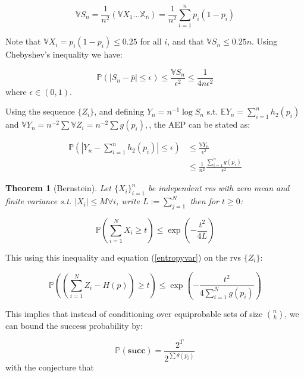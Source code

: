 \documentclass[11pt]{article}
\newtheorem{thm}{Theorem}[section]
\begin{document}
\begin{equation}
\mathbb{V}S_n = \frac{1}{n^2} \left(\mathbb{V}X_1 \ldots	\mathbb{X_n} \right) = \frac{1}{n^2} \sum_{i=1}^{n} p_i\left(1-p_i\right)
\end{equation}

Note that \(\mathbb{V}X_i = p_i\left(1-p_i\right) \leq 0.25\) for all \(i\), and that \(\mathbb{V}S_n \leq 0.25n\). 
Using Chebyshev's inequality we have:

\begin{equation}
\mathbb{P}\left(|S_n - \bar{p}| \leq \epsilon \right) \leq \frac{\mathbb{V}S_n}{\epsilon^2} \leq \frac{1}{4n\epsilon^2}
\end{equation}
where \(\epsilon \in \left(0,1\right)\).

Using the sequence \(\{Z_i\}\), and defining \(Y_n = n^{-1}\log{S_n}\) s.t. \(\mathbb{E}Y_n = \sum_{i=1}^n h_2\left(p_i\right)\) and \(\mathbb{V}Y_n = n^{-2}\sum\mathbb{V}Z_i = n^{-2}\sum g\left(p_i\right),\), the AEP can be stated as:

\begin{align}
\mathbb{P}\left(|Y_n - \sum_{i=1}^n h_2\left(p_i\right)| \leq \epsilon \right) &\leq \frac{\mathbb{V}Y_n}{\epsilon^2} \\ 
&\leq \frac{1}{n^2}\frac{\sum_{i=1}^n g\left(p_i\right)}{\epsilon^2}
\end{align}

\begin{thm}[Bernstein]
Let \(\{X_i\}_{i=1}^n\) be independent rvs with zero mean and finite variance s.t. \(|X_i| \leq M \forall i\), write \(L:= \sum_{j=1}^N\) then for \(t\geq 0\):

\begin{equation}
\mathbb{P}\left(\sum_{i=1}^N X_i \geq t\right) \leq \exp{\left(-\frac{t^2}{4L}\right)}
\end{equation}
\end{thm}

This using this inequality and equation (\ref{entropyvar}) on the rvs \(\{Z_i\}\):

\begin{equation}
\mathbb{P}\left( \left(\sum_{i=1}^N Z_i -H\left(p\right)\right) \geq t\right) \leq \exp{\left(-\frac{t^2}{4\sum_{i=1}^N g\left(p_i\right)}\right)}
\end{equation}

This implies that instead of conditioning over equiprobable sets of size \(n\choose k\), we can bound the success probability by:

\begin{equation}
\mathbb{P}\left(\textbf{succ}\right) = \frac{2^T}{2^{\sum \theta\left(p_i\right) } }
\end{equation}
with the conjecture that 
\end{document}
